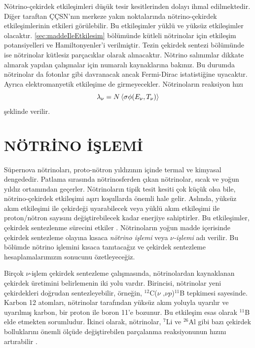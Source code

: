 Nötrino-çekirdek etkileşimleri düşük tesir kesitlerinden dolayı ihmal edilmektedir. Diğer taraftan ÇÇSN'nın merkeze yakın noktalarında nötrino-çekirdek etkileşimlerinin etkileri görülebilir. Bu etkileşimler yüklü ve yüksüz etkileşimler olacaktır. \ref{sec:maddeIleEtkilesim} bölümünde kütleli nötrinolar için etkileşim potansiyelleri ve Hamiltonyenler'i verilmiştir. Tezin çekirdek sentezi bölümünde ise nötrinolar kütlesiz parçacıklar olarak alınacaktır. Nötrino salınımlar dikkate alınarak yapılan çalışmalar için \cite{Wu:2014kaa,Kusakabe:2019znq} numaralı kaynaklarına bakınız. Bu durumda nötrinolar da fotonlar gibi davranacak ancak Fermi-Dirac istatistiğine uyacaktır. Ayrıca elektromanyetik etkileşime de girmeyecekler. Nötrinoların reaksiyon hızı 
\begin{equation}
    \lambda_{\nu}=N\expval{\sigma \phi(E_{\nu},T_{\nu})}
    \end{equation}
şeklinde verilir.

\section{NÖTRİNO İŞLEMİ}\label{sec:NotrinoIslem}
\paragraph{}
Süpernova nötrinoları, proto-nötron yıldızının içinde termal ve kimyasal dengededir. Patlama sırasında nötrinosferden çıkan nötrinolar, sıcak ve yoğun yıldız ortamından geçerler. Nötrinoların tipik tesit kesiti çok küçük olsa bile, nötrino-çekirdek etkileşimi aşırı koşullarda önemli hale gelir. Aslında, yüksüz akım etkileşimi ile çekirdeği uyarabilecek veya yüklü akım etkileşimi ile proton/nötron sayısını değiştirebilecek kadar enerjiye sahiptirler. Bu etkileşimler, çekirdek sentezlenme sürecini etkiler \cite{Woosley:1989bd}. Nötrinoların yoğun madde içerisinde çekirdek sentezleme olayına kısaca \textit{nötrino işlemi} veya \emph{$ \nu $-işlemi} adı verilir. Bu bölümde nötrino işlemini kısaca tanıtacağız ve çekirdek sentezleme hesaplamalarımızın sonucunu özetleyeceğiz.

Birçok $ \nu $-işlem çekirdek sentezleme çalışmasında, nötrinolardan kaynaklanan çekirdek üretimini belirlemenin iki yolu vardır. Birincisi, nötrinolar yeni çekirdekleri doğrudan sentezleyebilir, örneğin, $ ^{12} $C($ \nu\text{ ,}\nu p $)$ ^{11} $B tepkimesi sayesinde. Karbon 12 atomları, nötrinolar tarafından yüksüz akım yoluyla uyarılır ve uyarılmış karbon, bir proton ile boron 11'e bozunur. Bu etkileşim esas olarak $ ^{11} $B elde etmekten sorumludur. İkinci olarak, nötrinolar, $ ^{7} $Li ve $ ^{26} $Al gibi bazı çekirdek bolluklarını önemli ölçüde değiştirebilen parçalanma reaksiyonunun hızını artırabilir \cite{Sieverding:2018rdt}.


